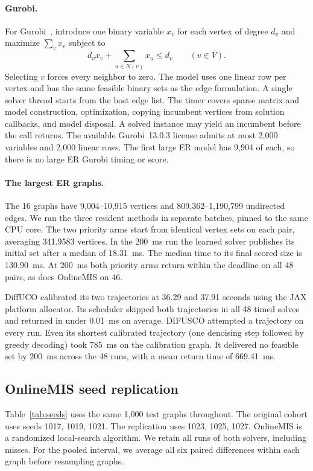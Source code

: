 \paragraph{Gurobi.} For Gurobi~\citep{gurobi2026}, introduce one binary variable $x_v$ for each vertex of degree $d_v$ and maximize $\sum_v x_v$ subject to
\[
 d_v x_v + \sum_{u\in N(v)} x_u \le d_v \qquad (v\in V).
\]
Selecting $v$ forces every neighbor to zero. The model uses one linear row per vertex and has the same feasible binary sets as the edge formulation. A single solver thread starts from the host edge list. The timer covers sparse matrix and model construction, optimization, copying incumbent vertices from solution callbacks, and model disposal. A solved instance may yield an incumbent before the call returns. The available Gurobi~13.0.3 license admits at most 2,000 variables and 2,000 linear rows. The first large ER model has 9,904 of each, so there is no large ER Gurobi timing or score.

\paragraph{The largest ER graphs.} The 16 graphs have 9,004--10,915 vertices and 809,362--1,190,799 undirected edges. We ran the three resident methods in separate batches, pinned to the same CPU core. The two priority arms start from identical vertex sets on each pair, averaging 341.9583 vertices. In the 200~ms run the learned solver publishes its initial set after a median of 18.31~ms. The median time to its final scored size is 130.90~ms. At 200~ms both priority arms return within the deadline on all 48 pairs, as does OnlineMIS on 46.

DiffUCO calibrated its two trajectories at 36.29 and 37.91 seconds using the JAX platform allocator. Its scheduler skipped both trajectories in all 48 timed solves and returned in under 0.01~ms on average. DIFUSCO attempted a trajectory on every run. Even its shortest calibrated trajectory (one denoising step followed by greedy decoding) took 785~ms on the calibration graph. It delivered no feasible set by 200~ms across the 48 runs, with a mean return time of 669.41~ms.

\subsection{OnlineMIS seed replication}
\label{app:seeds}
Table~\ref{tab:seeds} uses the same 1,000 test graphs throughout. The original cohort uses seeds 1017, 1019, 1021. The replication uses 1023, 1025, 1027. OnlineMIS is a randomized local-search algorithm. We retain all runs of both solvers, including misses. For the pooled interval, we average all six paired differences within each graph before resampling graphs.

